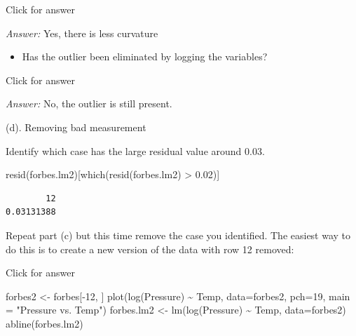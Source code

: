 \documentclass[
]{book}
\newenvironment{Shaded}{\begin{snugshade}}{\end{snugshade}}
\newcommand{\AttributeTok}[1]{\textcolor[rgb]{0.77,0.63,0.00}{#1}}
\newcommand{\DecValTok}[1]{\textcolor[rgb]{0.00,0.00,0.81}{#1}}
\newcommand{\FloatTok}[1]{\textcolor[rgb]{0.00,0.00,0.81}{#1}}
\newcommand{\FunctionTok}[1]{\textcolor[rgb]{0.00,0.00,0.00}{#1}}
\newcommand{\NormalTok}[1]{#1}
\newcommand{\OtherTok}[1]{\textcolor[rgb]{0.56,0.35,0.01}{#1}}
\newcommand{\SpecialCharTok}[1]{\textcolor[rgb]{0.00,0.00,0.00}{#1}}
\newcommand{\StringTok}[1]{\textcolor[rgb]{0.31,0.60,0.02}{#1}}
\providecommand{\tightlist}{%
  \setlength{\itemsep}{0pt}\setlength{\parskip}{0pt}}
\begin{document}
Click for answer

\emph{Answer:} Yes, there is less curvature

\begin{itemize}
\tightlist
\item
  Has the outlier been eliminated by logging the variables?
\end{itemize}

Click for answer

\emph{Answer:} No, the outlier is still present.

(d). Removing bad measurement

Identify which case has the large residual value around 0.03.

\begin{Shaded}
\begin{Highlighting}[]
\FunctionTok{resid}\NormalTok{(forbes.lm2)[}\FunctionTok{which}\NormalTok{(}\FunctionTok{resid}\NormalTok{(forbes.lm2) }\SpecialCharTok{\textgreater{}} \FloatTok{0.02}\NormalTok{)]}
\end{Highlighting}
\end{Shaded}

\begin{verbatim}
        12 
0.03131388 
\end{verbatim}

Repeat part (c) but this time remove the case you identified. The easiest way to do this is to create a new version of the data with row 12 removed:

Click for answer

\begin{Shaded}
\begin{Highlighting}[]
\NormalTok{forbes2 }\OtherTok{\textless{}{-}}\NormalTok{ forbes[}\SpecialCharTok{{-}}\DecValTok{12}\NormalTok{, ]}
\FunctionTok{plot}\NormalTok{(}\FunctionTok{log}\NormalTok{(Pressure) }\SpecialCharTok{\textasciitilde{}}\NormalTok{ Temp, }\AttributeTok{data=}\NormalTok{forbes2, }\AttributeTok{pch=}\DecValTok{19}\NormalTok{, }\AttributeTok{main =} \StringTok{"Pressure vs. Temp"}\NormalTok{)}
\NormalTok{forbes.lm2 }\OtherTok{\textless{}{-}} \FunctionTok{lm}\NormalTok{(}\FunctionTok{log}\NormalTok{(Pressure) }\SpecialCharTok{\textasciitilde{}}\NormalTok{ Temp, }\AttributeTok{data=}\NormalTok{forbes2)}
\FunctionTok{abline}\NormalTok{(forbes.lm2)}
\end{Highlighting}
\end{Shaded}
\end{document}
